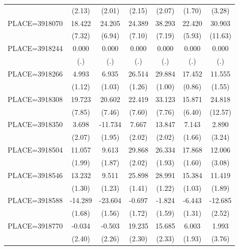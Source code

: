 {\begin{tabular}{l*{6}{c}}
                    &      (2.13)&      (2.01)&      (2.15)&      (2.07)&      (1.70)&      (3.28)\\
PLACE=3918070       &      18.422&      24.205&      24.389&      38.293&      22.420&      30.903\\
                    &      (7.32)&      (6.94)&      (7.10)&      (7.19)&      (5.93)&     (11.63)\\
PLACE=3918244       &       0.000&       0.000&       0.000&       0.000&       0.000&       0.000\\
                    &         (.)&         (.)&         (.)&         (.)&         (.)&         (.)\\
PLACE=3918266       &       4.993&       6.935&      26.514&      29.884&      17.452&      11.555\\
                    &      (1.12)&      (1.03)&      (1.26)&      (1.00)&      (0.86)&      (1.55)\\
PLACE=3918308       &      19.723&      20.602&      22.419&      33.123&      15.871&      24.818\\
                    &      (7.85)&      (7.46)&      (7.60)&      (7.76)&      (6.40)&     (12.57)\\
PLACE=3918350       &       3.698&     -11.734&       7.667&      13.847&       7.143&       2.890\\
                    &      (2.07)&      (1.95)&      (2.02)&      (2.02)&      (1.66)&      (3.24)\\
PLACE=3918504       &      11.057&       9.613&      29.868&      26.334&      17.868&      12.006\\
                    &      (1.99)&      (1.87)&      (2.02)&      (1.93)&      (1.60)&      (3.08)\\
PLACE=3918546       &      13.232&       9.511&      25.898&      28.991&      15.384&      11.419\\
                    &      (1.30)&      (1.23)&      (1.41)&      (1.22)&      (1.03)&      (1.89)\\
PLACE=3918588       &     -14.289&     -23.604&      -0.697&      -1.824&      -6.443&     -12.685\\
                    &      (1.68)&      (1.56)&      (1.72)&      (1.59)&      (1.31)&      (2.52)\\
PLACE=3918770       &      -0.034&      -0.503&      19.235&      15.685&       6.003&       1.993\\
                    &      (2.40)&      (2.26)&      (2.30)&      (2.33)&      (1.93)&      (3.76)\\

\end{tabular}}
